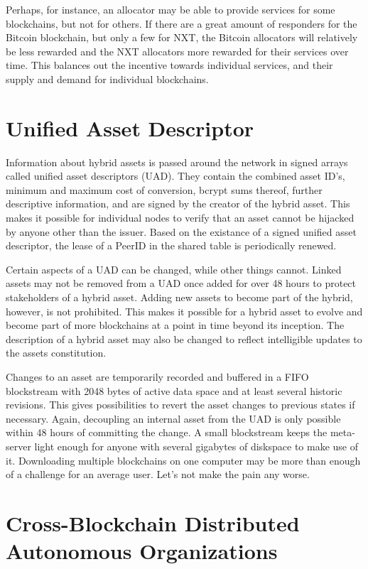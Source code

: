 \documentclass[a4paper]{article}
\begin{document}
Perhaps, for instance, an allocator may be able to provide services for some blockchains, but not for others. If there are a great amount of responders for the Bitcoin blockchain, but only a few for NXT, the Bitcoin allocators will relatively be less rewarded and the NXT allocators more rewarded for their services over time. This balances out the incentive towards individual services, and their supply and demand for individual blockchains.


\section{Unified Asset Descriptor}

Information about hybrid assets is passed around the network in signed arrays called unified asset descriptors (UAD). They contain the combined asset ID's, minimum and maximum cost of conversion, bcrypt sums thereof, further descriptive information, and are signed by the creator of the hybrid asset. This makes it possible for individual nodes to verify that an asset cannot be hijacked by anyone other than the issuer. Based on the existance of a signed unified asset descriptor, the lease of a PeerID in the shared table is periodically renewed.

Certain aspects of a UAD can be changed, while other things cannot. Linked assets may not be removed from a UAD once added for over 48 hours to protect stakeholders of a hybrid asset. Adding new assets to become part of the hybrid, however, is not prohibited. This makes it possible for a hybrid asset to evolve and become part of more blockchains at a point in time beyond its inception. The description of a hybrid asset may also be changed to reflect intelligible updates to the assets constitution.

Changes to an asset are temporarily recorded and buffered in a FIFO blockstream with 2048 bytes of active data space and at least several historic revisions. This gives possibilities to revert the asset changes to previous states if necessary. Again, decoupling an internal asset from the UAD is only possible within 48 hours of committing the change. A small blockstream keeps the meta-server light enough for anyone with several gigabytes of diskspace to make use of it. Downloading multiple blockchains on one computer may be more than enough of a challenge for an average user. Let's not make the pain any worse.


\section{Cross-Blockchain Distributed Autonomous Organizations}
\end{document}

